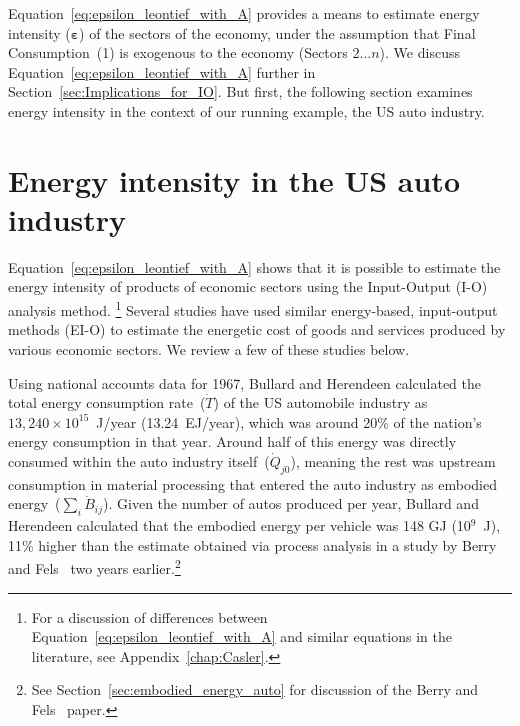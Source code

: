 Equation~\ref{eq:epsilon_leontief_with_A} provides a means 
to estimate energy intensity ($\boldsymbol{\varepsilon}$)
of the sectors of the economy, under the assumption that
Final Consumption~(1) is exogenous to the economy (Sectors $2\ldots{}n$). 
We discuss Equation~\ref{eq:epsilon_leontief_with_A}
further in Section~\ref{sec:Implications_for_IO}.
But first, the following section examines energy intensity 
in the context of our running example, the US auto industry.


\section{Energy intensity in the US auto industry}
\label{sec:intensity_auto}

Equation~\ref{eq:epsilon_leontief_with_A} shows 
that it is possible to estimate the energy intensity 
of products of economic sectors 
using the Input-Output (I-O) analysis method.%
	\footnote{
	For a discussion
	of differences between Equation~\ref{eq:epsilon_leontief_with_A} 
	and similar equations in the literature, 
	see Appendix~\ref{chap:Casler}.
	}
Several studies have used similar energy-based, 
input-output methods (EI-O) to estimate the energetic
cost of goods and services produced by various
economic sectors.\cite{Bullard1975, Costanza:1980ww, Costanza:1984tq, EIOLCA2014, Hendrickson2006,
Herendeen1973, Herendeen1974, Herendeen1974a, Herendeen1978,
Wright1974, Lenzen1998, Machado2001}
We review a few of these studies below.

Using national accounts data for 1967,
Bullard and Herendeen calculated the
total energy consumption rate~($\dot{T}$)
of the US automobile industry as 
$13,240\times10^{15}$~J/year (13.24~EJ/year),
which was around 20\% of the nation's
energy consumption in that year.\cite{Bullard1975}
Around half of this energy was directly
consumed within the auto industry itself~($\dot{Q}_{j0}$),
meaning the rest was upstream consumption
in material processing
that entered the auto industry as embodied 
energy~($\sum_{i}\dot{B}_{ij}$).
Given the number of autos produced per year, 
Bullard and Herendeen calculated that 
the embodied energy per vehicle was 148 GJ (10$^{9}$~J),
11\% higher than the estimate obtained via process analysis in a
study by Berry and Fels~\cite{Berry:1973vo} two years earlier.\footnote{See
Section~\ref{sec:embodied_energy_auto} for discussion 
of the Berry and Fels~\cite{Berry:1973vo} paper.}

